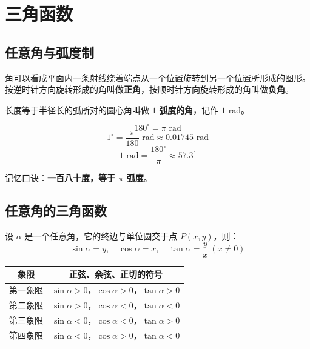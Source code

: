 \chapter{三角函数}

\section{任意角与弧度制}

\begin{definition}[任意角]
角可以看成平面内一条射线绕着端点从一个位置旋转到另一个位置所形成的图形。按逆时针方向旋转形成的角叫做\textbf{正角}，按顺时针方向旋转形成的角叫做\textbf{负角}。
\end{definition}

\begin{definition}[弧度制]
长度等于半径长的弧所对的圆心角叫做 $1$ \textbf{弧度的角}，记作 $1$ rad。
\end{definition}

\begin{theorem}[角度与弧度的换算]
\[ 180^\circ = \pi \text{ rad} \]
\[ 1^\circ = \frac{\pi}{180} \text{ rad} \approx 0.01745 \text{ rad} \]
\[ 1 \text{ rad} = \frac{180^\circ}{\pi} \approx 57.3^\circ \]
\end{theorem}

\begin{note}
记忆口诀：\textbf{一百八十度，等于 $\pi$ 弧度}。
\end{note}

\section{任意角的三角函数}

\begin{definition}[三角函数的定义]
设 $\alpha$ 是一个任意角，它的终边与单位圆交于点 $P(x, y)$，则：
\[ \sin\alpha = y, \quad \cos\alpha = x, \quad \tan\alpha = \frac{y}{x} \ (x \neq 0) \]
\end{definition}

\begin{theorem}[三角函数值的符号]
\begin{center}
\begin{tabular}{c|c}
\toprule
象限 & 正弦、余弦、正切的符号 \\
\midrule
第一象限 & $\sin\alpha > 0$，$\cos\alpha > 0$，$\tan\alpha > 0$ \\
第二象限 & $\sin\alpha > 0$，$\cos\alpha < 0$，$\tan\alpha < 0$ \\
第三象限 & $\sin\alpha < 0$，$\cos\alpha < 0$，$\tan\alpha > 0$ \\
第四象限 & $\sin\alpha < 0$，$\cos\alpha > 0$，$\tan\alpha < 0$ \\
\bottomrule
\end{tabular}
\end{center}
\end{theorem}

